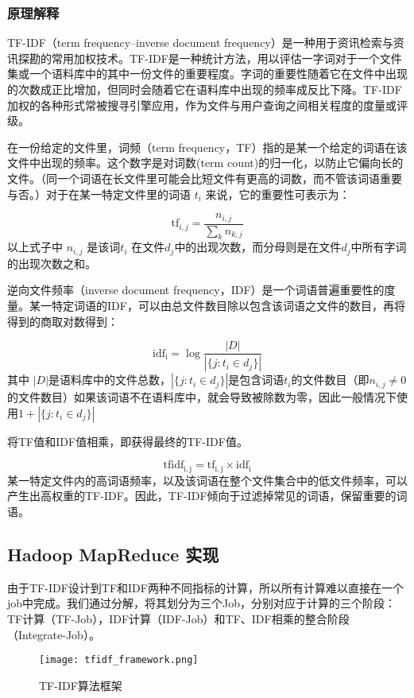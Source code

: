 \documentclass[lang=cn,11pt]{elegantpaper}
\begin{document}
\subsubsection{原理解释}
TF-IDF（term frequency–inverse document frequency）是一种用于资讯检索与资讯探勘的常用加权技术。TF-IDF是一种统计方法，用以评估一字词对于一个文件集或一个语料库中的其中一份文件的重要程度。字词的重要性随着它在文件中出现的次数成正比增加，但同时会随着它在语料库中出现的频率成反比下降。TF-IDF加权的各种形式常被搜寻引擎应用，作为文件与用户查询之间相关程度的度量或评级。\par
在一份给定的文件里，词频（term frequency，TF）指的是某一个给定的词语在该文件中出现的频率。这个数字是对词数(term count)的归一化，以防止它偏向长的文件。（同一个词语在长文件里可能会比短文件有更高的词数，而不管该词语重要与否。）对于在某一特定文件里的词语 $t_{i}$ 来说，它的重要性可表示为：\par
$$\mathrm{tf}_{i,j}=\frac{n_{i,j}}{\sum_{k}n_{k,j}}$$
以上式子中 $n_{i,j}$ 是该词$t_{i}$ 在文件$d_{j}$中的出现次数，而分母则是在文件$d_{j}$中所有字词的出现次数之和。\par
逆向文件频率（inverse document frequency，IDF）是一个词语普遍重要性的度量。某一特定词语的IDF，可以由总文件数目除以包含该词语之文件的数目，再将得到的商取对数得到：\par
$$\mathrm{idf_{i}} =  \log \frac{|D|}{|\{j: t_{i} \in d_{j}\}|}$$
其中 $|D|$是语料库中的文件总数，$|\{ j: t_{i} \in d_{j}\}|$是包含词语$t_{i}$的文件数目（即$n_{i,j} \neq 0$的文件数目）如果该词语不在语料库中，就会导致被除数为零，因此一般情况下使用$1 + |\{j : t_{i} \in d_{j}\}|$\par
将TF值和IDF值相乘，即获得最终的TF-IDF值。\par
$$\mathrm{tf{}idf_{i,j}} = \mathrm{tf_{i,j}} \times  \mathrm{idf_{i}}$$
某一特定文件内的高词语频率，以及该词语在整个文件集合中的低文件频率，可以产生出高权重的TF-IDF。因此，TF-IDF倾向于过滤掉常见的词语，保留重要的词语。

\subsection{Hadoop MapReduce 实现}
由于TF-IDF设计到TF和IDF两种不同指标的计算，所以所有计算难以直接在一个job中完成。我们通过分解，将其划分为三个Job，分别对应于计算的三个阶段：TF计算（TF-Job），IDF计算（IDF-Job）和TF、IDF相乘的整合阶段（Integrate-Job）。

\begin{figure}[htbp]
	\centering
	\texttt{[image: tfidf\_framework.png]}
	\caption{TF-IDF算法框架 \label{fig:tfidf_framework}}
\end{figure}
\end{document}
